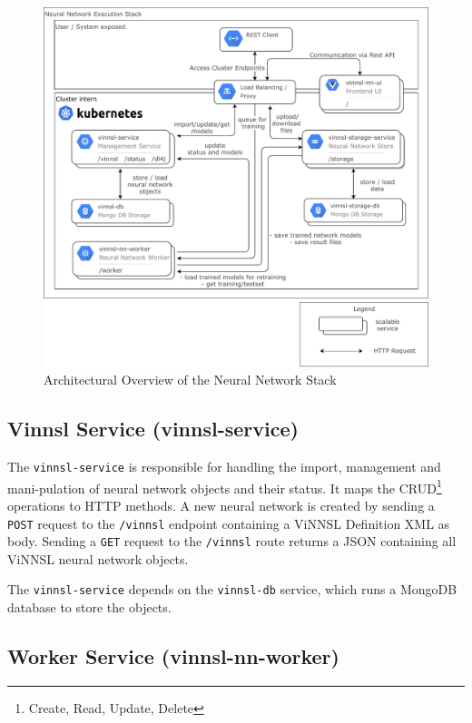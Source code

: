 \begin{figure}
\centering
\includegraphics[width=16.50000cm]{images/overview_nn_architecture}
\caption{Architectural Overview of the Neural Network
Stack\label{img.overview_nn_architecture}}
\end{figure}

\subsection{Vinnsl Service
(vinnsl-service)}\label{vinnsl-service-vinnsl-service}

The \texttt{vinnsl-service} is responsible for handling the import,
management and mani-pulation of neural network objects and their status.
It maps the CRUD\footnote{Create, Read, Update, Delete} operations to
HTTP methods. A new neural network is created by sending a \texttt{POST}
request to the \texttt{/vinnsl} endpoint containing a ViNNSL Definition
XML as body. Sending a \texttt{GET} request to the \texttt{/vinnsl}
route returns a JSON containing all ViNNSL neural network objects.

The \texttt{vinnsl-service} depends on the \texttt{vinnsl-db} service,
which runs a MongoDB database to store the objects.

\subsection{Worker Service
(vinnsl-nn-worker)}\label{worker-service-vinnsl-nn-worker}

